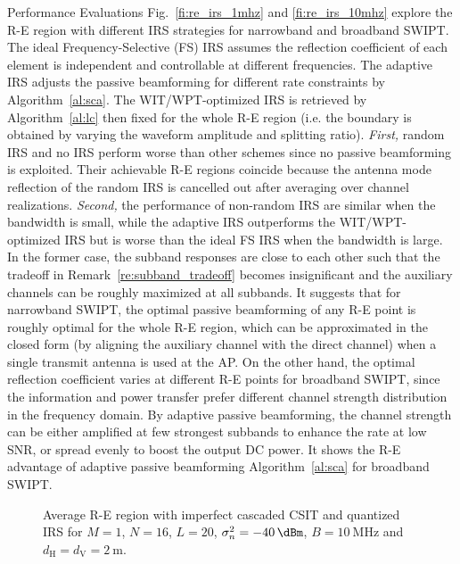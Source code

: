 \documentclass[journal]{IEEEtran}
\begin{document}
\begin{section}{Performance Evaluations}
		Fig.~\ref{fi:re_irs_1mhz} and \ref{fi:re_irs_10mhz} explore the R-E region with different IRS strategies for narrowband and broadband SWIPT. The ideal Frequency-Selective (FS) IRS assumes the reflection coefficient of each element is independent and controllable at different frequencies. The adaptive IRS adjusts the passive beamforming for different rate constraints by Algorithm~\ref{al:sca}. The WIT/WPT-optimized IRS is retrieved by Algorithm~\ref{al:lc} then fixed for the whole R-E region (i.e. the boundary is obtained by varying the waveform amplitude and splitting ratio). \emph{First,} random IRS and no IRS perform worse than other schemes since no passive beamforming is exploited. Their achievable R-E regions coincide because the antenna mode reflection of the random IRS is cancelled out after averaging over channel realizations. \emph{Second,} the performance of non-random IRS are similar when the bandwidth is small, while the adaptive IRS outperforms the WIT/WPT-optimized IRS but is worse than the ideal FS IRS when the bandwidth is large. In the former case, the subband responses are close to each other such that the tradeoff in Remark~\ref{re:subband_tradeoff} becomes insignificant and the auxiliary channels can be roughly maximized at all subbands. It suggests that for narrowband SWIPT, the optimal passive beamforming of any R-E point is roughly optimal for the whole R-E region, which can be approximated in the closed form (by aligning the auxiliary channel with the direct channel) when a single transmit antenna is used at the AP. On the other hand, the optimal reflection coefficient varies at different R-E points for broadband SWIPT, since the information and power transfer prefer different channel strength distribution in the frequency domain. By adaptive passive beamforming, the channel strength can be either amplified at few strongest subbands to enhance the rate at low SNR, or spread evenly to boost the output DC power. It shows the R-E advantage of adaptive passive beamforming Algorithm~\ref{al:sca} for broadband SWIPT.

		\begin{figure}[!t]
			\centering
			\caption{Average R-E region with imperfect cascaded CSIT and quantized IRS for $M=1$, $N=16$, $L=20$, $\sigma_n^2=\SI{-40}{\dBm}$, $B=\SI{10}{\MHz}$ and $d_{\mathrm{H}}=d_{\mathrm{V}}=\SI{2}{\meter}$.}
		\end{figure}


\end{section}
\end{document}

